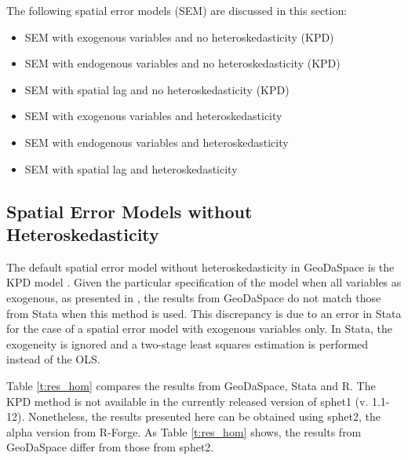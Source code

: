 \documentclass{article}
\begin{document}
The following spatial error models (SEM) are discussed in this section:

\begin{itemize}
\item SEM with exogenous variables and no heteroskedasticity (KPD)
\item SEM with endogenous variables and no heteroskedasticity (KPD)
\item SEM with spatial lag and no heteroskedasticity (KPD)
\item SEM with exogenous variables and heteroskedasticity
\item SEM with endogenous variables and heteroskedasticity
\item SEM with spatial lag and heteroskedasticity
\end{itemize}

\subsection{Spatial Error Models without Heteroskedasticity}

The default spatial error model without heteroskedasticity in GeoDaSpace is the KPD model \citep{Drukker10}. Given the particular specification of the model when all variables as exogenous, as presented in \citet{Anselin11}, the results from GeoDaSpace do not match those from Stata when this method is used. This discrepancy is due to an error in Stata for the case of a spatial error model with exogenous variables only. In Stata, the exogeneity is ignored and a two-stage least squares estimation is performed instead of the OLS.

Table \ref{t:res_hom} compares the results from GeoDaSpace, Stata and R. The KPD method is not available in the currently released version of sphet1 (v. 1.1-12). Nonetheless, the results presented here can be obtained using sphet2, the alpha version from R-Forge. As Table \ref{t:res_hom} shows, the results from GeoDaSpace differ from those from sphet2. 
\end{document}
